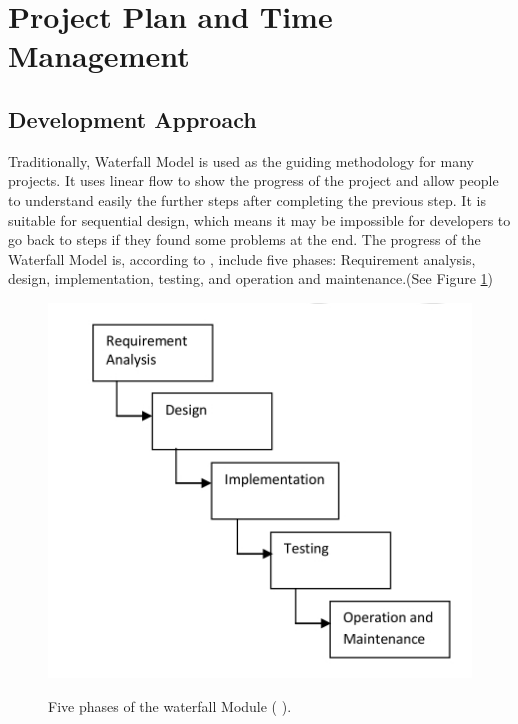 \clearpage
\section{Project Plan and Time Management}



\subsection{Development Approach}

Traditionally, Waterfall Model is used as the guiding methodology for many projects. It uses linear flow to show the progress of the project and allow people to understand easily the further steps after completing the previous step. It is suitable for sequential design, which means it may be impossible for developers to go back to steps if they found some problems at the end. The progress of the Waterfall Model is, according to \cite{Adenowo2013}, include five phases: Requirement analysis, design, implementation, testing, and operation and maintenance.(See Figure \ref{fig:waterfall})

\begin{figure}[H]
	\centering    
	\includegraphics[scale=1]{Figs/Waterfall-Model}\\[1ex]
	\caption{Five phases of the waterfall Module ( \cite{Adenowo2013}).}
	\label{fig:waterfall}
\end{figure}

